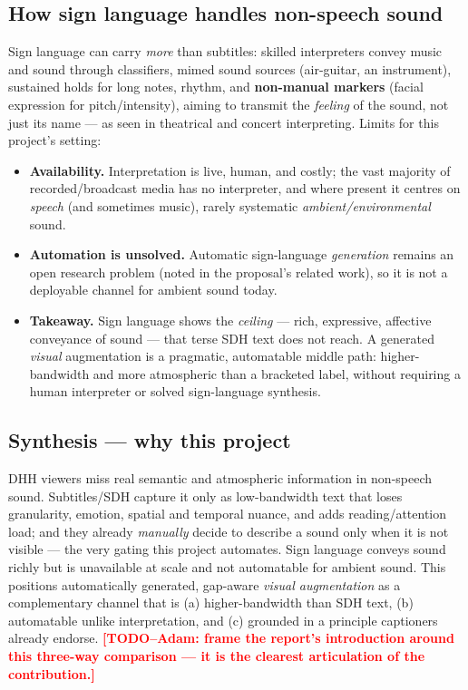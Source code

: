 \documentclass[11pt,a4paper]{article}
\newcommand{\TODO}[1]{\textcolor{red}{\textbf{[TODO--Adam: #1]}}}
\begin{document}
\subsection{How sign language handles non-speech sound}
Sign language can carry \emph{more} than subtitles: skilled interpreters convey music and sound
through classifiers, mimed sound sources (air-guitar, an instrument), sustained holds for long
notes, rhythm, and \textbf{non-manual markers} (facial expression for pitch/intensity), aiming to
transmit the \emph{feeling} of the sound, not just its name --- as seen in theatrical and concert
interpreting. Limits for this project's setting:
\begin{itemize}
  \item \textbf{Availability.} Interpretation is live, human, and costly; the vast majority of
    recorded/broadcast media has no interpreter, and where present it centres on \emph{speech} (and
    sometimes music), rarely systematic \emph{ambient/environmental} sound.
  \item \textbf{Automation is unsolved.} Automatic sign-language \emph{generation} remains an open
    research problem (noted in the proposal's related work), so it is not a deployable channel for
    ambient sound today.
  \item \textbf{Takeaway.} Sign language shows the \emph{ceiling} --- rich, expressive, affective
    conveyance of sound --- that terse SDH text does not reach. A generated \emph{visual}
    augmentation is a pragmatic, automatable middle path: higher-bandwidth and more atmospheric than
    a bracketed label, without requiring a human interpreter or solved sign-language synthesis.
\end{itemize}

\subsection{Synthesis --- why this project}
DHH viewers miss real semantic and atmospheric information in non-speech sound. Subtitles/SDH capture
it only as low-bandwidth text that loses granularity, emotion, spatial and temporal nuance, and adds
reading/attention load; and they already \emph{manually} decide to describe a sound only when it is
not visible --- the very gating this project automates. Sign language conveys sound richly but is
unavailable at scale and not automatable for ambient sound. This positions automatically generated,
gap-aware \emph{visual augmentation} as a complementary channel that is (a) higher-bandwidth than
SDH text, (b) automatable unlike interpretation, and (c) grounded in a principle captioners already
endorse. \TODO{frame the report's introduction around this three-way comparison --- it is the
clearest articulation of the contribution.}
\end{document}
